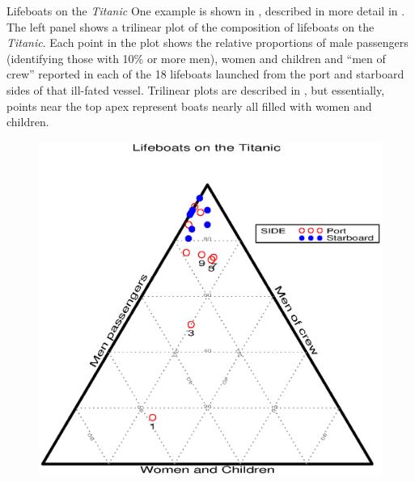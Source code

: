 \begin{Example}[lifeboat0]{Lifeboats on the \emph{Titanic}}
One example is shown in , described in more
detail in .
The left panel shows a trilinear plot of the composition of 
lifeboats on the \emph{Titanic}.
Each point in the plot shows the relative proportions of male
passengers
(identifying those with 10\% or more men), women and children and ``men of crew'' reported in each of the
18 lifeboats launched from the port and starboard sides of that
ill-fated vessel.
Trilinear plots are described in ,
but essentially, points near the top apex represent boats
nearly all filled with women and children.
\begin{figure}[htb]
 \begin{minipage}[c]{.49\linewidth}
  \includegraphics[width=1\linewidth,clip]{ch3/fig/lifeboat1}
 \end{minipage}%
 \hfill
 \begin{minipage}[c]{.49\linewidth}

\end{minipage}
\end{figure}
\end{Example}
